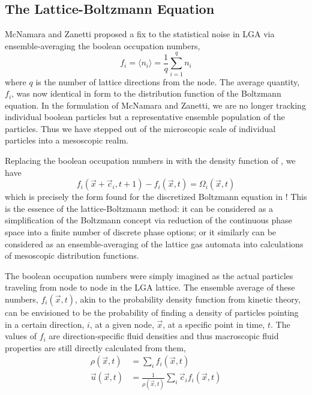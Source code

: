 \subsection{The Lattice-Boltzmann Equation}\label{sec:lbm-equations}

McNamara and Zanetti proposed a fix to the statistical noise in LGA via ensemble-averaging the boolean occupation numbers,\cite{McNamara1988}
\begin{equation}\label{eq:lbm-pdf}
	f_i = \langle n_i \rangle = \frac{1}{q}\sum_{i=1}^qn_i
\end{equation}
where $q$ is the number of lattice directions from the node. The average quantity, $f_i$, was now identical in form to the distribution function of the Boltzmann equation. In the formulation of McNamara and Zanetti, we are no longer tracking individual boolean particles but a representative ensemble population of the particles. Thus we have stepped out of the microscopic scale of individual particles into a mesoscopic realm. 

Replacing the boolean occupation numbers in  with the density function of , we have
\begin{equation}\label{eq:lbm-evolution}
	f_i(\vec{x}+\vec{c}_i, t + 1) - f_i(\vec{x},t) = \Omega_i(\vec{x},t)
\end{equation}
which is precisely the form found for the discretized Boltzmann equation in ! This is the essence of the lattice-Boltzmann method: it can be considered as a simplification of the Boltzmann concept via reduction of the continuous phase space into a finite number of discrete phase options; or it similarly can be considered as an ensemble-averaging of the lattice gas automata into calculations of mesoscopic distribution functions.

The boolean occupation numbers were simply imagined as the actual particles traveling from node to node in the LGA lattice. The ensemble average of these numbers, $f_i(\vec{x},t)$, akin to the probability density function from kinetic theory, can be envisioned to be the probability of finding a density of particles pointing in a certain direction, $i$, at a given node, $\vec{x}$, at a specific point in time, $t$. The values of $f_i$ are direction-specific fluid densities and thus macroscopic fluid properties are still directly calculated from them,
\begin{subequations}\label{eq:lbm2physical}
\begin{align}
	\rho(\vec{x},t) &= \sum_i f_i(\vec{x},t)\\
	\vec{u}(\vec{x},t) &= \frac{1}{\rho(\vec{x},t)}\sum_i \vec{c}_if_i(\vec{x},t)
\end{align}
\end{subequations}

